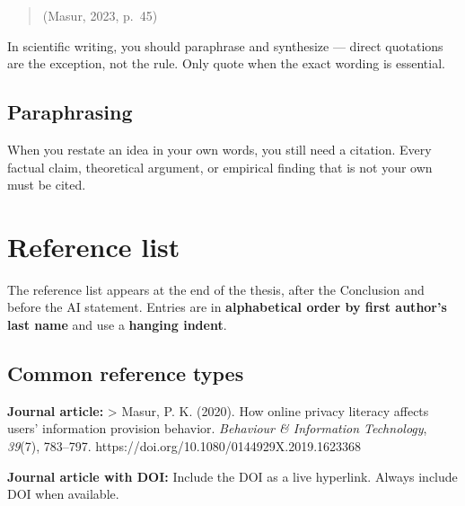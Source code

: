 \documentclass[
  11pt,
  a4paper,
]{scrbook}
\begin{document}
\begin{quote}
(Masur, 2023, p.~45)
\end{quote}

\begin{tcolorbox}[enhanced jigsaw, bottomrule=.15mm, opacityback=0, toprule=.15mm, colframe=quarto-callout-note-color-frame, left=2mm, rightrule=.15mm, title=\textcolor{quarto-callout-note-color}{\faInfo}\hspace{0.5em}{Minimize direct quotations}, colbacktitle=quarto-callout-note-color!10!white, bottomtitle=1mm, colback=white, breakable, toptitle=1mm, titlerule=0mm, leftrule=.75mm, arc=.35mm, opacitybacktitle=0.6, coltitle=black]

In scientific writing, you should paraphrase and synthesize --- direct
quotations are the exception, not the rule. Only quote when the exact
wording is essential.

\end{tcolorbox}

\subsection{Paraphrasing}\label{paraphrasing}

When you restate an idea in your own words, you still need a citation.
Every factual claim, theoretical argument, or empirical finding that is
not your own must be cited.

\section{Reference list}\label{reference-list}

The reference list appears at the end of the thesis, after the
Conclusion and before the AI statement. Entries are in
\textbf{alphabetical order by first author's last name} and use a
\textbf{hanging indent}.

\subsection{Common reference types}\label{common-reference-types}

\textbf{Journal article:} \textgreater{} Masur, P. K. (2020). How online
privacy literacy affects users' information provision behavior.
\emph{Behaviour \& Information Technology}, \emph{39}(7), 783--797.
https://doi.org/10.1080/0144929X.2019.1623368

\textbf{Journal article with DOI:} Include the DOI as a live hyperlink.
Always include DOI when available.
\end{document}
